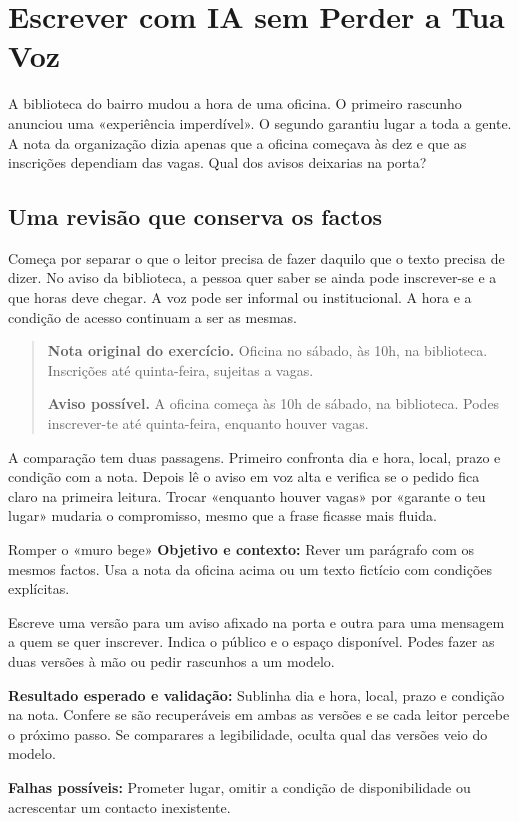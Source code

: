 \chapter{Escrever com IA sem Perder a Tua Voz}
\label{ch:escrita}

\ficcao A biblioteca do bairro mudou a hora de uma oficina. O primeiro rascunho anunciou uma «experiência imperdível». O segundo garantiu lugar a toda a gente. A nota da organização dizia apenas que a oficina começava às dez e que as inscrições dependiam das vagas. Qual dos avisos deixarias na porta?

\section{Uma revisão que conserva os factos}

Começa por separar o que o leitor precisa de fazer daquilo que o texto precisa de dizer. No aviso da biblioteca, a pessoa quer saber se ainda pode inscrever-se e a que horas deve chegar. A voz pode ser informal ou institucional. A hora e a condição de acesso continuam a ser as mesmas.

\begin{quote}
\small
\textbf{Nota original do exercício.} Oficina no sábado, às 10h, na biblioteca. Inscrições até quinta-feira, sujeitas a vagas.

\textbf{Aviso possível.} A oficina começa às 10h de sábado, na biblioteca. Podes inscrever-te até quinta-feira, enquanto houver vagas.
\end{quote}

A comparação tem duas passagens. Primeiro confronta dia e hora, local, prazo e condição com a nota. Depois lê o aviso em voz alta e verifica se o pedido fica claro na primeira leitura. Trocar «enquanto houver vagas» por «garante o teu lugar» mudaria o compromisso, mesmo que a frase ficasse mais fluida.

\begin{promptlabbox}{Romper o «muro bege»}
\textbf{Objetivo e contexto:} Rever um parágrafo com os mesmos factos. Usa a nota da oficina acima ou um texto fictício com condições explícitas.

Escreve uma versão para um aviso afixado na porta e outra para uma mensagem a quem se quer inscrever. Indica o público e o espaço disponível. Podes fazer as duas versões à mão ou pedir rascunhos a um modelo.

\textbf{Resultado esperado e validação:} Sublinha dia e hora, local, prazo e condição na nota. Confere se são recuperáveis em ambas as versões e se cada leitor percebe o próximo passo. Se comparares a legibilidade, oculta qual das versões veio do modelo.

\textbf{Falhas possíveis:} Prometer lugar, omitir a condição de disponibilidade ou acrescentar um contacto inexistente.
\end{promptlabbox}

